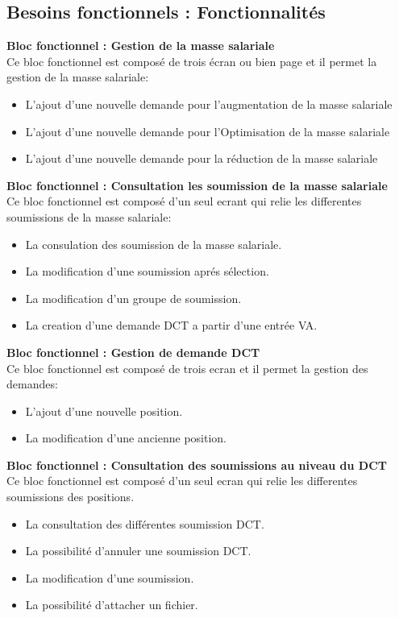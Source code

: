 \subsection{Besoins fonctionnels : Fonctionnalités}

\textbf{\color{red}Bloc fonctionnel : Gestion de la masse salariale}
\\[0.3cm] 
Ce bloc fonctionnel est composé de trois écran ou bien page et il permet la gestion de la masse salariale:
\\
\begin{itemize}
    \item L'ajout d'une nouvelle demande pour l'augmentation de la masse salariale 
    \item L'ajout d'une nouvelle demande pour l'Optimisation de la masse salariale 
    \item L'ajout d'une nouvelle demande pour la réduction de la masse salariale 
\end{itemize}

\vspace{0.5cm}
\textbf{\color{red}Bloc fonctionnel : Consultation les soumission de la masse salariale}
\\[0.3cm]    
Ce bloc fonctionnel est composé d'un seul ecrant qui relie les differentes soumissions de la masse salariale:
\\
\begin{itemize}
    \item La consulation des soumission de la masse salariale.
    \item La modification d'une soumission aprés sélection.
    \item La modification d'un groupe de soumission.
    \item La creation d'une demande DCT a partir d'une entrée VA.
\end{itemize}

\newpage
\textbf{\color{red}Bloc fonctionnel : Gestion de demande DCT}
\\[0.3cm]    
Ce bloc fonctionnel est composé de trois ecran et il permet la gestion des demandes: 
\\
\begin{itemize}
    \item L'ajout d'une nouvelle position.
    \item La modification d'une ancienne position.
\end{itemize}

\vspace{0.5cm}
\textbf{\color{red}Bloc fonctionnel : Consultation des soumissions au niveau du DCT}
\\[0.3cm]    
Ce bloc fonctionnel est composé d'un seul ecran qui relie les differentes soumissions des positions.
\begin{itemize}
    \item La consultation des différentes soumission DCT.
    \item La possibilité d'annuler une soumission DCT.
    \item La modification d'une soumission.
    \item La possibilité d'attacher un fichier.
\end{itemize}

